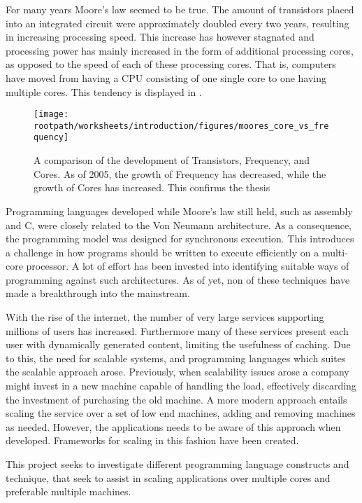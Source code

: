 \makeatletter {}\makeatother
{}
For many years Moore's law\cite{moore1965cramming} seemed to be true. The amount of transistors placed into an integrated circuit were approximately doubled every two years, resulting in increasing processing speed. This increase has however stagnated and processing power has mainly increased in the form of additional processing cores, as opposed to the speed of each of these processing cores\cite[p. 22]{sevenModels}. That is, computers have moved from having a \ac{CPU} consisting of one single core to one having multiple cores. This tendency is displayed in .

\begin{figure}[htbp]
\centering
 \texttt{[image: \\rootpath/worksheets/introduction/figures/moores\_core\_vs\_frequency]} 
 \caption{A comparison of the development of Transistors, Frequency, and Cores\cite{isca2009}. As of 2005, the growth of Frequency has decreased, while the growth of Cores has increased. This confirms the thesis}
\label{fig:moores_in_reality}
\end{figure}

Programming languages developed while Moore's law still held, such as assembly and C, were closely related to the Von Neumann architecture. As a consequence, the programming model was designed for synchronous execution. This introduces a challenge in how programs should be written to execute efficiently on a multi-core processor. A lot of effort has been invested into identifying suitable ways of programming against such architectures. As of yet, non of these techniques have made a breakthrough into the mainstream. 

With the rise of the internet, the number of very large services supporting millions of users has increased. Furthermore many of these services present each user with dynamically generated content, limiting the usefulness of caching. Due to this, the need for scalable systems, and programming languages which suites the scalable approach arose. Previously, when scalability issues arose a company might invest in a new machine capable of handling the load, effectively discarding the investment of purchasing the old machine\cite[p. 2]{haller2007actors}. A more modern approach entails scaling the service over a set of low end machines, adding and removing machines as needed. However, the applications needs to be aware of this approach when developed. Frameworks for scaling in this fashion have been created\cite{haller2007actors}\cite{krohn2004building}.


This project seeks to investigate different programming language constructs and technique, that seek to assist in scaling applications over multiple cores and preferable multiple machines.



 
\worksheetend
